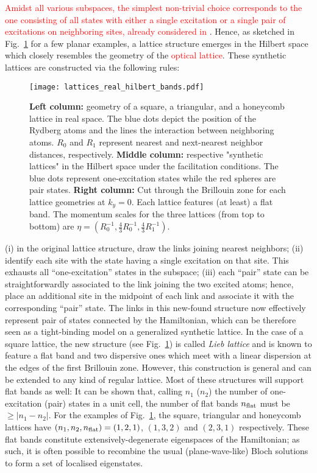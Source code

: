 \documentclass[prl,aps,twocolumn,showpacs,superscriptaddress,longbibliography]{revtex4-1}
\newcommand{\abs}[1]{\left| #1 \right|}
\newcommand{\changer}[1]{\textcolor{red}{#1}}
\begin{document}
\changer{Amidst all various subspaces, the simplest non-trivial choice corresponds to the one consisting of all states with either a single excitation or a single pair of excitations on neighboring sites, already considered in \cite{Mattioli2015, a_Marcuzzi_PRL_17}}. Hence, as sketched in Fig.~\ref{Fig:flat_band_lattices} for a few planar examples, a lattice structure emerges in the Hilbert space which closely resembles the geometry of the \changer{optical lattice}. These synthetic lattices are constructed via the following rules:
\begin{figure}
\texttt{[image: lattices\_real\_hilbert\_bands.pdf]}
\caption{\textbf{Left column:} geometry of a square, a triangular, and a honeycomb lattice in real space. The blue dots depict the position of the Rydberg atoms and the lines the interaction between neighboring atoms. $R_0$ and $R_1$ represent nearest and next-nearest neighbor distances, respectively. \textbf{Middle column:} respective "synthetic lattices" in the Hilbert space under the facilitation conditions. The blue dots represent one-excitation states while the red spheres are pair states. \textbf{Right column:} Cut through the Brillouin zone for each lattice geometries at $k_y= 0$. Each lattice features (at least) a flat band. The momentum scales for the three lattices (from top to bottom) are $\eta=(R^{-1}_0,\tfrac{4}{3}R^{-1}_0,\tfrac{4}{3}R^{-1}_1).$}
\label{Fig:flat_band_lattices}
\end{figure}
(i) in the original lattice structure, draw the links joining nearest neighbors; (ii) identify each site with the state having a single excitation on that site. This exhausts all ``one-excitation'' states in the subspace; (iii) each ``pair'' state can be straightforwardly associated to the link joining the two excited atoms; hence, place an additional site in the midpoint of each link and associate it with the corresponding ``pair'' state. The links in this new-found structure now effectively represent pair of states connected by the Hamiltonian, which can be therefore seen as a tight-binding model on a generalized synthetic lattice. In the case of a square lattice, the new structure (see Fig.~\ref{Fig:flat_band_lattices}) is called \emph{Lieb lattice} and is known to feature a flat band and two dispersive ones which meet with a linear dispersion at the edges of the first Brillouin zone. However, this construction is general and can be extended to any kind of regular \cite{footnote1} lattice. Most of these structures will support flat bands as well: It can be shown \cite{SM} that, calling $n_1$ ($n_2$) the number of one-excitation (pair) states in a unit cell, the number of flat bands $n_{\rm flat}$ must be $\geq \abs{n_1 - n_2}$. For the examples of Fig.~\ref{Fig:flat_band_lattices}, the square, triangular and honeycomb lattices have $(n_1,n_2,n_{\rm flat}) = (1,2,1)$, $(1,3,2)$ and $(2,3,1)$ respectively. These flat bands constitute extensively-degenerate eigenspaces of the Hamiltonian; as such, it is often possible to recombine the usual (plane-wave-like) Bloch solutions to form a set of localised eigenstates.
\end{document}
